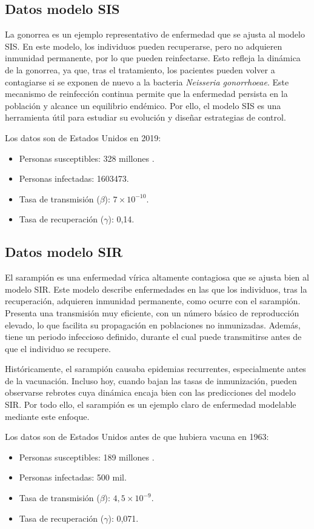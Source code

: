 \subsection{Datos modelo SIS}
La gonorrea es un ejemplo representativo de enfermedad que se ajusta al modelo SIS. En este modelo, los individuos pueden recuperarse, pero no adquieren inmunidad permanente, por lo que pueden reinfectarse. Esto refleja la dinámica de la gonorrea, ya que, tras el tratamiento, los pacientes pueden volver a contagiarse si se exponen de nuevo a la bacteria \textit{Neisseria gonorrhoeae}.
Este mecanismo de reinfección continua permite que la enfermedad persista en la población y alcance un equilibrio endémico. Por ello, el modelo SIS es una herramienta útil para estudiar su evolución y diseñar estrategias de control. 

Los datos son de Estados Unidos en 2019:
\begin{itemize}
    \item Personas susceptibles: 328 millones .
    \item Personas infectadas: 1603473.
    \item Tasa de transmisión ($\beta$): $7 \times 10^{-10}$.
    \item Tasa de recuperación ($\gamma$): 0,14.
    
\end{itemize}


\subsection{Datos modelo SIR}
El sarampión es una enfermedad vírica altamente contagiosa que se ajusta bien al modelo SIR. Este modelo describe enfermedades en las que los individuos, tras la recuperación, adquieren inmunidad permanente, como ocurre con el sarampión.
Presenta una transmisión muy eficiente, con un número básico de reproducción elevado, lo que facilita su propagación en poblaciones no inmunizadas. Además, tiene un periodo infeccioso definido, durante el cual puede transmitirse antes de que el individuo se recupere.

Históricamente, el sarampión causaba epidemias recurrentes, especialmente antes de la vacunación. Incluso hoy, cuando bajan las tasas de inmunización, pueden observarse rebrotes cuya dinámica encaja bien con las predicciones del modelo SIR. Por todo ello, el sarampión es un ejemplo claro de enfermedad modelable mediante este enfoque.

Los datos son de Estados Unidos antes de que hubiera vacuna en 1963:
\begin{itemize}
    \item Personas susceptibles: 189 millones .
    \item Personas infectadas: 500 mil.
    \item Tasa de transmisión ($\beta$): $4,5 \times 10^{-9}$.
    \item Tasa de recuperación ($\gamma$): 0,071.  
\end{itemize}


